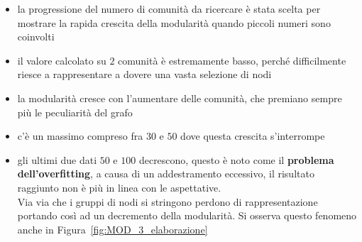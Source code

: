\begin{itemize}
	\item la progressione del numero di comunità da ricercare è stata scelta per mostrare la rapida crescita della modularità quando piccoli numeri sono coinvolti
	\item il valore calcolato su $2$ comunità è estremamente basso, perché difficilmente riesce a rappresentare a dovere una vasta selezione di nodi
	\item la modularità cresce con l'aumentare delle comunità, che premiano sempre più le peculiarità del grafo
	\item c'è un massimo compreso fra $30$ e $50$ dove questa crescita s'interrompe
	\item gli ultimi due dati $50$ e $100$ decrescono, questo è noto come il \textbf{problema dell'overfitting}, a causa di un addestramento eccessivo, il risultato raggiunto non è più in linea con le aspettative.\\
	Via via che i gruppi di nodi si stringono perdono di rappresentazione portando così ad un decremento della modularità. Si osserva questo fenomeno anche in Figura~\ref{fig:MOD_3_elaborazione}
\end{itemize}

